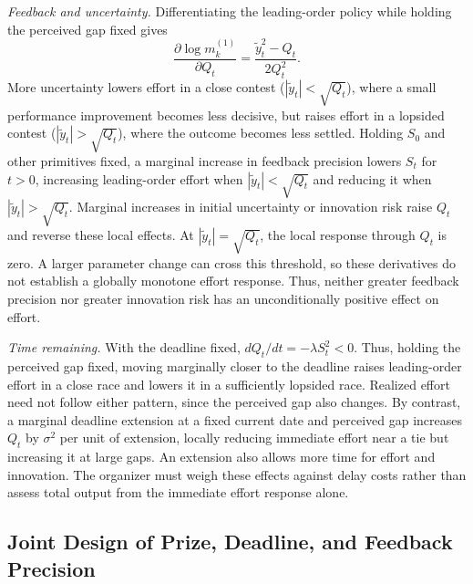 \documentclass[mnsc]{informs3}
\begin{document}
\textit{Feedback and uncertainty.} Differentiating the leading-order policy while holding the perceived gap fixed gives
\[
\frac{\partial\log m_k^{(1)}}{\partial Q_t}
=\frac{\tilde y_t^2-Q_t}{2Q_t^2}.
\]
More uncertainty lowers effort in a close contest ($|\tilde y_t|<\sqrt{Q_t}$), where a small performance improvement becomes less decisive, but raises effort in a lopsided contest ($|\tilde y_t|>\sqrt{Q_t}$), where the outcome becomes less settled. {Holding $S_0$ and other primitives fixed, a marginal increase in feedback precision lowers $S_t$ for $t>0$, increasing leading-order effort when $|\tilde y_t|<\sqrt{Q_t}$ and reducing it when $|\tilde y_t|>\sqrt{Q_t}$. Marginal increases in initial uncertainty or innovation risk raise $Q_t$ and reverse these local effects. At $|\tilde y_t|=\sqrt{Q_t}$, the local response through $Q_t$ is zero. A larger parameter change can cross this threshold, so these derivatives do not establish a globally monotone effort response. Thus, neither greater feedback precision nor greater innovation risk has an unconditionally positive effect on effort.}

\textit{Time remaining.} With the deadline fixed, $dQ_t/dt=-\lambda S_t^2<0$. {Thus, holding the perceived gap fixed, moving marginally closer to the deadline raises leading-order effort in a close race and lowers it in a sufficiently lopsided race.} Realized effort need not follow either pattern, since the perceived gap also changes. {By contrast, a marginal deadline extension at a fixed current date and perceived gap increases $Q_t$ by $\sigma^2$ per unit of extension, locally reducing immediate effort near a tie but increasing it at large gaps.} An extension also allows more time for effort and innovation. The organizer must weigh these effects against delay costs rather than assess total output from the immediate effort response alone.

\subsection{{Joint Design of Prize, Deadline, and Feedback Precision}}\label{sect-design}
\end{document}
